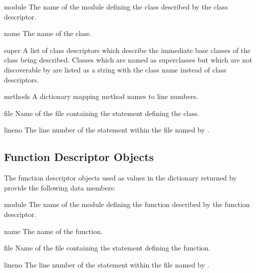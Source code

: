 \begin{memberdesc}{module}
  The name of the module defining the class described by the class
  descriptor.
\end{memberdesc}

\begin{memberdesc}{name}
  The name of the class.
\end{memberdesc}

\begin{memberdesc}{super}
  A list of class descriptors which describe the immediate base
  classes of the class being described.  Classes which are named as
  superclasses but which are not discoverable by
   are listed as a string with the class name
  instead of class descriptors.
\end{memberdesc}

\begin{memberdesc}{methods}
  A dictionary mapping method names to line numbers.
\end{memberdesc}

\begin{memberdesc}{file}
  Name of the file containing the  statement defining the class.
\end{memberdesc}

\begin{memberdesc}{lineno}
  The line number of the  statement within the file named by
  .
\end{memberdesc}

\subsection{Function Descriptor Objects \label{pyclbr-function-objects}}

The function descriptor objects used as values in the dictionary returned
by  provide the following data members:


\begin{memberdesc}{module}
  The name of the module defining the function described by the function
  descriptor.
\end{memberdesc}

\begin{memberdesc}{name}
  The name of the function.
\end{memberdesc}

\begin{memberdesc}{file}
  Name of the file containing the  statement defining the function.
\end{memberdesc}

\begin{memberdesc}{lineno}
  The line number of the  statement within the file named by
  .
\end{memberdesc}
